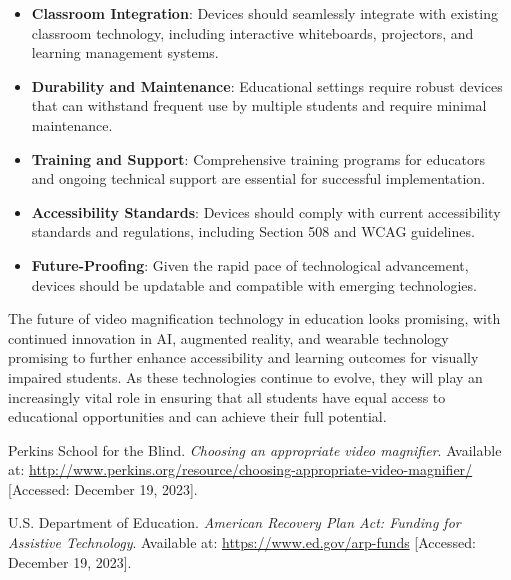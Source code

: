 \begin{itemize}

 \item \textbf{Classroom Integration}: Devices should seamlessly integrate with existing classroom technology, including interactive whiteboards, projectors, and learning management systems.

 \item \textbf{Durability and Maintenance}: Educational settings require robust devices that can withstand frequent use by multiple students and require minimal maintenance.

 \item \textbf{Training and Support}: Comprehensive training programs for educators and ongoing technical support are essential for successful implementation.

 \item \textbf{Accessibility Standards}: Devices should comply with current accessibility standards and regulations, including Section 508 and WCAG guidelines.

 \item \textbf{Future-Proofing}: Given the rapid pace of technological advancement, devices should be updatable and compatible with emerging technologies.

\end{itemize}

The future of video magnification technology in education looks promising, with continued innovation in AI, augmented reality, and wearable technology promising to further enhance accessibility and learning outcomes for visually impaired students. As these technologies continue to evolve, they will play an increasingly vital role in ensuring that all students have equal access to educational opportunities and can achieve their full potential.

\begin{thebibliography}{99}

 Perkins School for the Blind. \textit{Choosing an appropriate video magnifier}. Available at: \url{http://www.perkins.org/resource/choosing-appropriate-video-magnifier/} [Accessed: December 19, 2023].

 U.S. Department of Education. \textit{American Recovery Plan Act: Funding for Assistive Technology}. Available at: \url{https://www.ed.gov/arp-funds} [Accessed: December 19, 2023].

\end{thebibliography}
